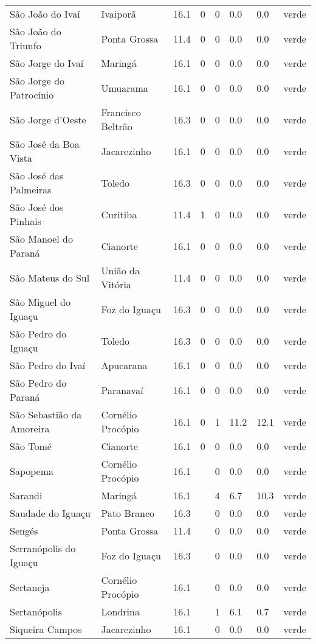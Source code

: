 \begin{longtable}{l|lllllll}
  São João do Ivaí & Ivaiporã & 16.1 & 0 & 0 & 0.0 & 0.0 & verde \\ 
  São João do Triunfo & Ponta Grossa & 11.4 & 0 & 0 & 0.0 & 0.0 & verde \\ 
  São Jorge do Ivaí & Maringá & 16.1 & 0 & 0 & 0.0 & 0.0 & verde \\ 
  São Jorge do Patrocínio & Umuarama & 16.1 & 0 & 0 & 0.0 & 0.0 & verde \\ 
  São Jorge d'Oeste & Francisco Beltrão & 16.3 & 0 & 0 & 0.0 & 0.0 & verde \\ 
  São José da Boa Vista & Jacarezinho & 16.1 & 0 & 0 & 0.0 & 0.0 & verde \\ 
  São José das Palmeiras & Toledo & 16.3 & 0 & 0 & 0.0 & 0.0 & verde \\ 
  São José dos Pinhais & Curitiba & 11.4 & 1 & 0 & 0.0 & 0.0 & verde \\ 
  São Manoel do Paraná & Cianorte & 16.1 & 0 & 0 & 0.0 & 0.0 & verde \\ 
  São Mateus do Sul & União da Vitória & 11.4 & 0 & 0 & 0.0 & 0.0 & verde \\ 
  São Miguel do Iguaçu & Foz do Iguaçu & 16.3 & 0 & 0 & 0.0 & 0.0 & verde \\ 
  São Pedro do Iguaçu & Toledo & 16.3 & 0 & 0 & 0.0 & 0.0 & verde \\ 
  São Pedro do Ivaí & Apucarana & 16.1 & 0 & 0 & 0.0 & 0.0 & verde \\ 
  São Pedro do Paraná & Paranavaí & 16.1 & 0 & 0 & 0.0 & 0.0 & verde \\ 
  São Sebastião da Amoreira & Cornélio Procópio & 16.1 & 0 & 1 & 11.2 & 12.1 & verde \\ 
  São Tomé & Cianorte & 16.1 & 0 & 0 & 0.0 & 0.0 & verde \\ 
  Sapopema & Cornélio Procópio & 16.1 &  & 0 & 0.0 & 0.0 & verde \\ 
  Sarandi & Maringá & 16.1 &  & 4 & 6.7 & 10.3 & verde \\ 
  Saudade do Iguaçu & Pato Branco & 16.3 &  & 0 & 0.0 & 0.0 & verde \\ 
  Sengés & Ponta Grossa & 11.4 &  & 0 & 0.0 & 0.0 & verde \\ 
  Serranópolis do Iguaçu & Foz do Iguaçu & 16.3 &  & 0 & 0.0 & 0.0 & verde \\ 
  Sertaneja & Cornélio Procópio & 16.1 &  & 0 & 0.0 & 0.0 & verde \\ 
  Sertanópolis & Londrina & 16.1 &  & 1 & 6.1 & 0.7 & verde \\ 
  Siqueira Campos & Jacarezinho & 16.1 &  & 0 & 0.0 & 0.0 & verde \\ 

\end{longtable}
